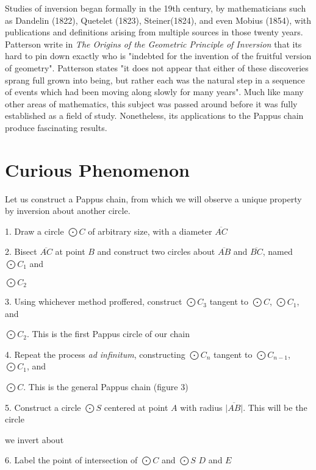 \documentclass[12pt]{article}
\begin{document}
Studies of inversion began formally in the 19th century, by mathematicians such as Dandelin (1822), Quetelet (1823), Steiner(1824), and even Mobius (1854), with publications and definitions arising from multiple sources in those twenty years. Patterson write in \textit{The Origins of the Geometric Principle of Inversion} that its hard to pin down exactly who is "indebted for the invention of the fruitful version of geometry". Patterson states "it does not appear that either of these discoveries sprang full grown into being, but rather each was the natural step in a sequence of events which had been moving along slowly for many years". Much like many other areas of mathematics, this subject was passed around before it was fully established as a field of study. Nonetheless, its applications to the Pappus chain produce fascinating results. 
\section{Curious Phenomenon}
\hspace{\parindent}Let us construct a Pappus chain, from which we will observe a unique property by inversion about another circle. 

1. Draw a circle $\bigodot{C}$ of arbitrary size, with a diameter $\overline{AC}$

2. Bisect $\overline{AC}$ at point $B$ and construct two circles about $\overline{AB}$ and $\overline{BC}$, named $\bigodot{C_1}$ and

\hspace{15}$\bigodot{C_2}$

3. Using whichever method proffered, construct $\bigodot{C_3}$ tangent to $\bigodot{C}$, $\bigodot{C_1}$, and 

\hspace{15} $\bigodot{C_2}$. This is the first Pappus circle of our chain

4. Repeat the process \textit{ad infinitum}, constructing $\bigodot{C_n}$ tangent to $\bigodot{C_{n-1}}$, $\bigodot{C_1}$, and 

\hspace{15} $\bigodot{C}$. This is the general Pappus chain (figure 3)

5. Construct a circle $\bigodot{S}$ centered at point $A$ with radius $\overline{|AB|}$. This will be the circle 

\hspace{15}we invert about 

6. Label the point of intersection of $\bigodot{C}$ and $\bigodot{S}$ $D$ and $E$
\end{document}
